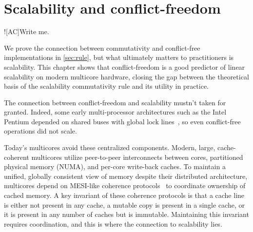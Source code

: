 \section{Scalability and conflict-freedom}
\label{sec:scalability}

\XXX![AC]{Write me.}






We prove the connection between commutativity and conflict-free
implementations in \cref{sec:rule}, but what ultimately matters to
practitioners is scalability.  This chapter shows that
conflict-freedom is a good predictor of linear scalability on modern
multicore hardware, closing the gap between the theoretical basis of
the scalability commutativity rule and its utility in practice.

The connection between conflict-freedom and scalability mustn't taken
for granted.  Indeed, some early multi-processor architectures such as
the Intel Pentium depended on shared buses with global lock
lines~\cite[\S8.1.4]{intel-sdm-3}, so even conflict-free operations
did not scale.

Today's multicores avoid these centralized components.  Modern, large,
cache-coherent multicores utilize peer-to-peer interconnects between
cores, partitioned physical memory (NUMA), and per-core write-back
caches.
%
To maintain a unified, globally consistent view of memory despite
their distributed architecture, multicores depend on MESI-like
coherence protocols~\cite{papamarcos:mesi} to coordinate ownership of
cached memory.
%
A key invariant of these coherence protocols is that a cache line is
either not present in any cache, a mutable copy is present in a single
cache, or it is present in any number of caches but is immutable.
%
Maintaining this invariant requires coordination, and this is where
the connection to scalability lies.


